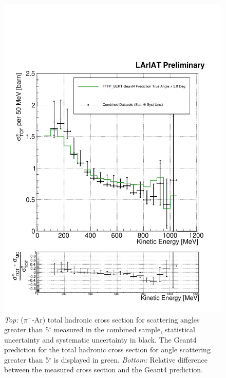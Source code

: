 \begin{figure}[htb]
\centering
\includegraphics[width=\textwidth]{Chapter-6/Images/TheRealMoneyPlot.pdf}
\caption{ \emph{Top:} ($\pi^-$-Ar) total hadronic cross section for  scattering angles greater than 5$^\circ$ measured in the combined sample, statistical uncertainty and systematic uncertainty in black. The Geant4 prediction for the total hadronic cross section for angle scattering greater than 5$^\circ$ is displayed in green. \emph{Bottom:} Relative difference between the measured cross section and the Geant4 prediction. }
\label{fig:FinalXSResPion}
\end{figure}



